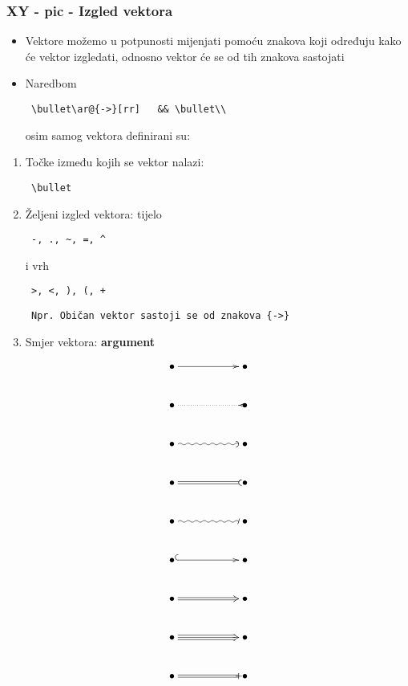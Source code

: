 \documentclass[9pt]{beamer}
\begin{document}
\begin{frame}[fragile]
    \frametitle{XY - pic - Izgled vektora}
    \begin{itemize}
        \item Vektore možemo u potpunosti mijenjati pomoću znakova koji određuju kako će vektor izgledati, odnosno vektor će se od tih znakova sastojati
		\item Naredbom \begin{verbatim} \bullet\ar@{->}[rr]   && \bullet\\\end{verbatim} osim samog vektora definirani su:
    \end{itemize}

    \begin{enumerate}
		\item Točke između kojih se vektor nalazi: \begin{verbatim} \bullet \end{verbatim}
		\item Željeni izgled vektora: tijelo \begin{verbatim} -, ., ~, =, ^ \end{verbatim}
		i vrh \begin{verbatim} >, <, ), (, + \end{verbatim}
        \begin{verbatim} Npr. Običan vektor sastoji se od znakova {->} \end{verbatim}
        \item Smjer vektora: \textbf{argument}
    \end{enumerate}
    \begin{displaymath}
            \xymatrix{
                \bullet\ar@{->}[rr]     && \bullet\\
                \bullet\ar@{.<}[rr]     && \bullet\\
                \bullet\ar@{~)}[rr]     && \bullet\\
                \bullet\ar@{=(}[rr]     && \bullet\\
                \bullet\ar@{~/}[rr]     && \bullet\\
                \bullet\ar@{^{(}->}[rr] && \bullet\\
                \bullet\ar@2{->}[rr]    && \bullet\\
                \bullet\ar@3{->}[rr]    && \bullet\\
                \bullet\ar@{=+}[rr]     && \bullet }
    \end{displaymath}
\end{frame}
\end{document}
